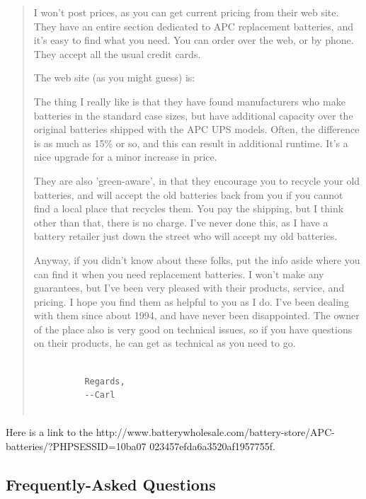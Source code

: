 {{{{{{{{{\begin{quote}
I won't post prices, as you can get current pricing from their web site. They
have an entire section dedicated to APC replacement batteries, and it's easy
to find what you need. You can order over the web, or by phone. They accept
all the usual credit cards.  

The web site (as you might guess) is: 

The thing I really like is that they have found manufacturers who make
batteries in the standard case sizes, but have additional capacity over the
original batteries shipped with the APC UPS models. Often, the difference is
as much as 15\% or so, and this can result in additional runtime. It's a nice
upgrade for a minor increase in price.  

They are also 'green-aware', in that they encourage you to recycle your old
batteries, and will accept the old batteries back from you if you cannot find
a local place that recycles them. You pay the shipping, but I think other than
that, there is no charge. I've never done this, as I have a battery retailer
just down the street who will accept my old batteries.  

Anyway, if you didn't know about these folks, put the info aside where you can
find it when you need replacement batteries. I won't make any guarantees, but
I've been very pleased with their products, service, and pricing. I hope you
find them as helpful to you as I do. I've been dealing with them since about
1994, and have never been disappointed. The owner of the place also is very
good on technical issues, so if you have questions on their products, he can
get as technical as you need to go.  

\footnotesize
\begin{verbatim}
          
          Regards,
          --Carl
     
\end{verbatim}
\normalsize

\end{quote}

Here is a link to the 
{http://www.batterywholesale.com/battery-store/APC-batteries/?PHPSESSID=10ba07%
023457efda6a3520af1957755f}. 

\label{Frequently_002dAsked-Questions}

\subsection*{Frequently-Asked Questions}

}}}}}}}}}
